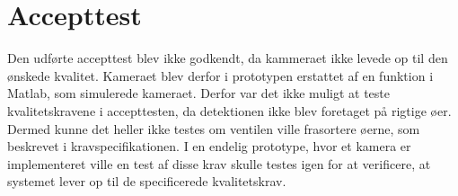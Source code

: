 \section{Accepttest}
Den udførte accepttest blev ikke godkendt, da kammeraet ikke levede op til den ønskede kvalitet. Kameraet blev derfor i prototypen erstattet af en funktion i Matlab, som simulerede kameraet. Derfor var det ikke muligt at teste kvalitetskravene i accepttesten, da detektionen ikke blev foretaget på rigtige øer. Dermed kunne det heller ikke testes om ventilen ville frasortere øerne, som beskrevet i kravspecifikationen. I en endelig prototype, hvor et kamera er implementeret ville en test af disse krav skulle testes igen for at verificere, at systemet lever op til de specificerede kvalitetskrav. 